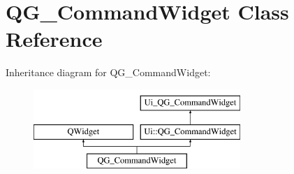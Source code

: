 \hypertarget{classQG__CommandWidget}{\section{Q\-G\-\_\-\-Command\-Widget Class Reference}
\label{classQG__CommandWidget}
}
Inheritance diagram for Q\-G\-\_\-\-Command\-Widget\-:\begin{figure}[H]
\begin{center}
\leavevmode
\includegraphics[height=3.000000cm]{classQG__CommandWidget}
\end{center}
\end{figure}
